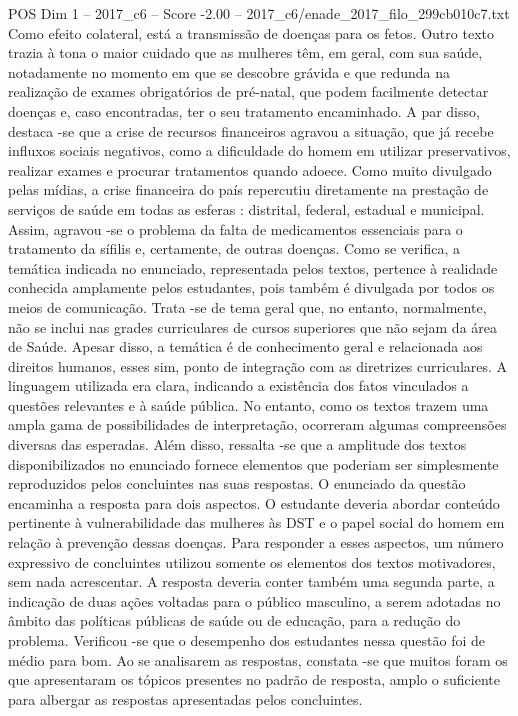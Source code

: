 \begin{textsample}{POS Dim 1 – 2017\_c6 – Score -2.00 – 2017\_c6/enade\_2017\_filo\_299cb010c7.txt}
Como efeito colateral, está a transmissão de doenças para os fetos.
Outro texto trazia à tona o maior cuidado que as mulheres têm, em geral, com sua saúde, notadamente no momento em que se descobre grávida e que redunda na realização de exames obrigatórios de pré-natal, que podem facilmente detectar doenças e, caso encontradas, ter o seu tratamento encaminhado.
A par disso, destaca -se que a crise de recursos financeiros agravou a situação, que já recebe influxos sociais negativos, como a dificuldade do homem em utilizar preservativos, realizar exames e procurar tratamentos quando adoece.
Como muito divulgado pelas mídias, a crise financeira do país repercutiu diretamente na prestação de serviços de saúde em todas as esferas : distrital, federal, estadual e municipal.
Assim, agravou -se o problema da falta de medicamentos essenciais para o tratamento da sífilis e, certamente, de outras doenças.
Como se verifica, a temática indicada no enunciado, representada pelos textos, pertence à realidade conhecida amplamente pelos estudantes, pois também é divulgada por todos os meios de comunicação.
Trata -se de tema geral que, no entanto, normalmente, não se inclui nas grades curriculares de cursos superiores que não sejam da área de Saúde.
Apesar disso, a temática é de conhecimento geral e relacionada aos direitos humanos, esses sim, ponto de integração com as diretrizes curriculares.
A linguagem utilizada era clara, indicando a existência dos fatos vinculados a questões relevantes e à saúde pública.
No entanto, como os textos trazem uma ampla gama de possibilidades de interpretação, ocorreram algumas compreensões diversas das esperadas.
Além disso, ressalta -se que a amplitude dos textos disponibilizados no enunciado fornece elementos que poderiam ser simplesmente reproduzidos pelos concluintes nas suas respostas.
O enunciado da questão encaminha a resposta para dois aspectos.
O estudante deveria abordar conteúdo pertinente à vulnerabilidade das mulheres às DST e o papel social do homem em relação à prevenção dessas doenças.
Para responder a esses aspectos, um número expressivo de concluintes utilizou somente os elementos dos textos motivadores, sem nada acrescentar.
A resposta deveria conter também uma segunda parte, a indicação de duas ações voltadas para o público masculino, a serem adotadas no âmbito das políticas públicas de saúde ou de educação, para a redução do problema.
Verificou -se que o desempenho dos estudantes nessa questão foi de médio para bom.
Ao se analisarem as respostas, constata -se que muitos foram os que apresentaram os tópicos presentes no padrão de resposta, amplo o suficiente para albergar as respostas apresentadas pelos concluintes.

\end{textsample}
